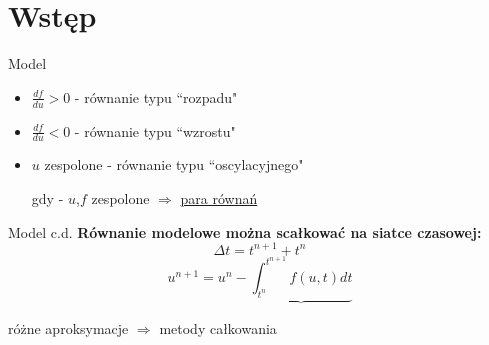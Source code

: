 \section{Wstęp}
\begin{frame}{Model}
  \begin{center}
  \end{center}
\begin{itemize}
    \item $\frac{df}{du} > 0$ - równanie typu ``rozpadu" 
    \item $\frac{df}{du} < 0$ - równanie typu ``wzrostu" \newline
    \item $u$ zespolone - równanie typu ``oscylacyjnego" \par
  \qquad\qquad gdy - $u$,$f$ zespolone $\Rightarrow$ \underline{para równań}
\end{itemize}

\end{frame}
\begin{frame}{Model c.d.}
  \textbf{Równanie modelowe można scałkować na siatce czasowej:}
  $$\Delta t = t^{n+1}+t^n$$
  $$u^{n+1} = u^n - \underbrace{\int_{t^n}^{t^{n+1}}f(u,t)dt}$$
  \begin{flushright}
    różne aproksymacje $\Rightarrow$ metody całkowania
  \end{flushright}
\end{frame}
